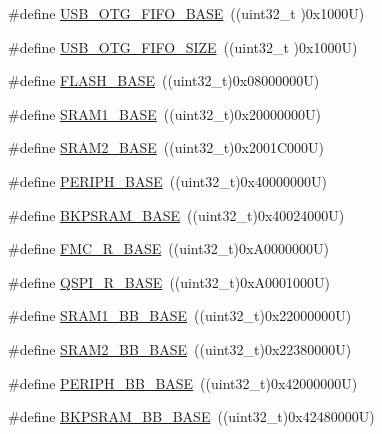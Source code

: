\begin{DoxyCompactItemize}
\#define \hyperlink{group___peripheral__memory__map_gace340350802904868673f0e839c4fa04}{U\+S\+B\+\_\+\+O\+T\+G\+\_\+\+F\+I\+F\+O\+\_\+\+B\+A\+SE}~((uint32\+\_\+t )0x1000\+U)
\item 
\#define \hyperlink{group___peripheral__memory__map_ga8781c4b2406c740d9fe540737a6a0188}{U\+S\+B\+\_\+\+O\+T\+G\+\_\+\+F\+I\+F\+O\+\_\+\+S\+I\+ZE}~((uint32\+\_\+t )0x1000\+U)
\item 
\#define \hyperlink{group___peripheral__memory__map_ga23a9099a5f8fc9c6e253c0eecb2be8db}{F\+L\+A\+S\+H\+\_\+\+B\+A\+SE}~((uint32\+\_\+t)0x08000000\+U)
\item 
\#define \hyperlink{group___peripheral__memory__map_ga7d0fbfb8894012dbbb96754b95e562cd}{S\+R\+A\+M1\+\_\+\+B\+A\+SE}~((uint32\+\_\+t)0x20000000\+U)
\item 
\#define \hyperlink{group___peripheral__memory__map_gadbb42a3d0a8a90a79d2146e4014241b1}{S\+R\+A\+M2\+\_\+\+B\+A\+SE}~((uint32\+\_\+t)0x2001\+C000\+U)
\item 
\#define \hyperlink{group___peripheral__memory__map_ga9171f49478fa86d932f89e78e73b88b0}{P\+E\+R\+I\+P\+H\+\_\+\+B\+A\+SE}~((uint32\+\_\+t)0x40000000\+U)
\item 
\#define \hyperlink{group___peripheral__memory__map_ga52e57051bdf8909222b36e5408a48f32}{B\+K\+P\+S\+R\+A\+M\+\_\+\+B\+A\+SE}~((uint32\+\_\+t)0x40024000\+U)
\item 
\#define \hyperlink{group___peripheral__memory__map_ga7a599164cd92798542bc6288793d1ed5}{F\+M\+C\+\_\+\+R\+\_\+\+B\+A\+SE}~((uint32\+\_\+t)0x\+A0000000\+U)
\item 
\#define \hyperlink{group___peripheral__memory__map_ga3b6b7d9c67dec50557fd634505198e9d}{Q\+S\+P\+I\+\_\+\+R\+\_\+\+B\+A\+SE}~((uint32\+\_\+t)0x\+A0001000\+U)
\item 
\#define \hyperlink{group___peripheral__memory__map_gac4c4f61082e4b168f29d9cf97dc3ca5c}{S\+R\+A\+M1\+\_\+\+B\+B\+\_\+\+B\+A\+SE}~((uint32\+\_\+t)0x22000000\+U)
\item 
\#define \hyperlink{group___peripheral__memory__map_gac33cb6edadf184ab9860d77089503922}{S\+R\+A\+M2\+\_\+\+B\+B\+\_\+\+B\+A\+SE}~((uint32\+\_\+t)0x22380000\+U)
\item 
\#define \hyperlink{group___peripheral__memory__map_gaed7efc100877000845c236ccdc9e144a}{P\+E\+R\+I\+P\+H\+\_\+\+B\+B\+\_\+\+B\+A\+SE}~((uint32\+\_\+t)0x42000000\+U)
\item 
\#define \hyperlink{group___peripheral__memory__map_gaee19a30c9fa326bb10b547e4eaf4e250}{B\+K\+P\+S\+R\+A\+M\+\_\+\+B\+B\+\_\+\+B\+A\+SE}~((uint32\+\_\+t)0x42480000\+U)

\end{DoxyCompactItemize}
